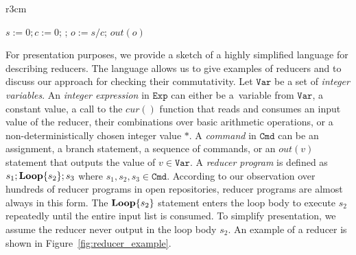 \documentclass{llncs}
\newcommand{\Var}{\mathtt{Var}}
\newcommand{\Exp}{\mathtt{Exp}}
\newcommand{\Cmd}{\mathtt{Cmd}}
\newcommand{\cur}{cur()}
\newcommand{\rloop}{
	\ifmmode
	\mathbf{Loop}
	\else
	\textbf{Loop}
	\fi}
\begin{document}
\begin{wrapfigure}{r}{3cm}
		\vspace{-0.8cm}

	
	\begin{minipage}{0.3\textwidth}
		\begin{algorithm}[H]
			$s := 0;c:=0$; \;
			\Loop{}{
				$s := s+\cur$;\;
				$c := c+1$
			};
			$o := s/c$;\;
			$out(o)$\;
		\end{algorithm}
	\end{minipage}


	\caption{A reducer that computes the average value.}
	\vspace{-0.8cm}
	\label{fig:reducer_example}
\end{wrapfigure}

For presentation purposes, we provide a sketch of a highly simplified language
for describing reducers. The language allows us to give examples of reducers and
to discuss our approach for checking their commutativity. Let $\Var$ be a set of
\emph{integer variables}. An \emph{integer expression} in $\Exp$ can either be
a~variable from $\Var$, a constant value, a call to the $\cur$ function that
reads and consumes an input value of the reducer, their combinations over basic
arithmetic operations, or a non-deterministically chosen integer value $*$. A
\emph{command} in $\Cmd$ can be an assignment, a branch statement, a sequence of
commands, or an $out(v)$ statement that outputs the value of $v \in \Var$. A
\emph{reducer program} is defined as $s_1;\rloop\{s_2\};s_3$ where $s_1,s_2,s_3
\in \Cmd$. According to our observation over hundreds  of reducer programs in
open repositories, reducer programs are almost always in this form. The
$\rloop\{s_2\}$ statement enters the loop body to execute $s_2$ repeatedly until
the entire input list is consumed. To simplify presentation, we assume the reducer never output in the loop body $s_2$. An example of a reducer is shown in
Figure~\ref{fig:reducer_example}.
\end{document}
